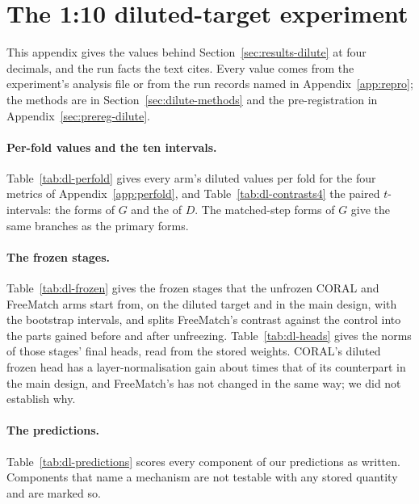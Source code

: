\section{The 1:10 diluted-target experiment}
\label{app:dilute10}

This appendix gives the values behind Section~\ref{sec:results-dilute} at four decimals, and the
run facts the text cites. Every value comes from the experiment's analysis file or from the run
records named in Appendix~\ref{app:repro}; the methods are in Section~\ref{sec:dilute-methods}
and the pre-registration in Appendix~\ref{sec:prereg-dilute}.

\paragraph{Per-fold values and the ten intervals.} Table~\ref{tab:dl-perfold} gives every arm's
diluted values per fold for the four metrics of Appendix~\ref{app:perfold}, and
Table~\ref{tab:dl-contrasts4} the \dlNtWord{} paired $t$-intervals: the \dlNtG{} forms of $G$ and
the \dlNtD{} of $D$. The matched-step forms of $G$ give the same branches as the primary forms.





\paragraph{The frozen stages.} Table~\ref{tab:dl-frozen} gives the frozen stages that the
unfrozen CORAL and FreeMatch arms start from, on the diluted target and in the main design, with
the \dlNbootWord{} bootstrap intervals, and splits FreeMatch's contrast against the control into
the parts gained before and after unfreezing. Table~\ref{tab:dl-heads} gives the norms of those
stages' final heads, read from the stored weights. CORAL's diluted frozen head has a
layer-normalisation gain about \dlCoralGainRatioWord{} times that of its counterpart in the
main design,
and FreeMatch's has not changed in the same way; we did not establish why.





\paragraph{The predictions.} Table~\ref{tab:dl-predictions} scores every component of our
\dlNPredWord{} predictions as written. Components that name a mechanism are not testable with
any stored quantity and are marked so.

